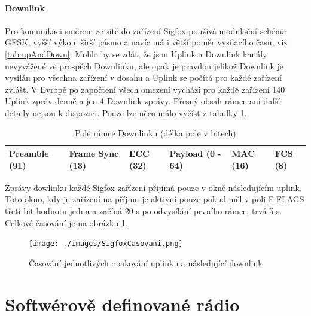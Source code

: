 \documentclass{ctuthesis}
\begin{document}
\subsubsection{Downlink}
Pro komunikaci směrem ze sítě do zařízení Sigfox používá modulační schéma GFSK, vyšší výkon, širší pásmo a navíc má i větší poměr vysílacího času, viz \ref{tab:upAndDown}. Mohlo by se zdát, že jsou Uplink a Downlink kanály nevyvážené ve prospěch Downlinku, ale opak je pravdou jelikož Downlink je vysílán pro všechna zařízení v dosahu a Uplink se počítá pro každé zařízení zvlášť. V Evropě po započtení všech omezení vychází pro každé zařízení 140 Uplink zpráv denně a jen 4 Downlink zprávy. Přesný obsah rámce ani další detaily nejsou k dispozici. Pouze lze něco málo vyčíst z tabulky \ref{tab:downlinkFrame}. \\
\begin{table}[]
\begin{tabular}{@{}|l|l|l|l|l|l|@{}}
\toprule
Preamble (91) & Frame Sync (13) & ECC (32) & Payload (0 - 64) & MAC (16) & FCS (8) \\ \bottomrule
\end{tabular}
\caption{Pole rámce Downlinku (délka pole v bitech) \cite{sifoxdecr}}
\label{tab:downlinkFrame}

\end{table}
Zprávy dowlinku každé Sigfox zařízení přijímá pouze v okně následujícím uplink. Toto okno, kdy je zařízení na příjmu je aktivní pouze pokud měl v poli F.FLAGS třetí bit hodnotu jedna a začíná 20 s po odvysílání prvního rámce, trvá 5 s. Celkové časování je na obrázku \ref{sigfoxCasovani}.
\begin{figure}
\caption{Časování jednotlivých opakování uplinku a následující downlink \cite{perrylea}}
\texttt{[image: ./images/SigfoxCasovani.png]}
\label{sigfoxCasovani}
\end{figure}

\chapter{Softwérově definované rádio} \label{chapter:sdr}
\end{document}
